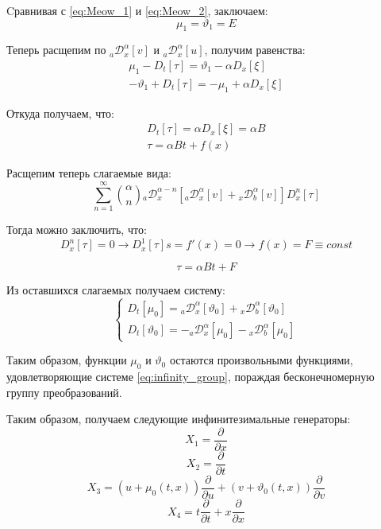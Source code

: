 \documentclass[a4paper, fontsize=14pt]{article}
\newcommand{\RLD}[3]{{}_{#1}\mathcal{D}_{#2}^{\alpha} \left[#3\right]} %
\newcommand{\D}[3]{D_{#1}^{#2} \left[ #3 \right]} %
\newcommand{\RLDa}[4]{{}_{#1}\mathcal{D}_{#2}^{#4} \left[#3\right]} %
\begin{document}
Cравнивая с \eqref{eq:Meow_1} и \eqref{eq:Meow_2}, заключаем:
\begin{equation*}
  \mu_1 = \vartheta _1 = E
\end{equation*}

Теперь расщепим по $\RLD{a}{x}{v}$ и $\RLD{a}{x}{u}$, получим равенства:
\begin{gather}
  \mu_1 - \D{t}{}{\tau} = \vartheta _1 - \alpha \D{x}{}{\xi} \\
  -\vartheta _1 + \D{t}{}{\tau} = - \mu_1 + \alpha \D{x}{}{\xi}
\end{gather}

Откуда получаем, что:
\begin{equation}
  \begin{aligned}
    \D{t}{}{\tau} = \alpha \D{x}{}{\xi} = \alpha B \\
    \tau = \alpha B t + f(x)
  \end{aligned}
\end{equation}

Расщепим теперь слагаемые вида:
\begin{equation*}
  \sum_{n=1}^{\infty} \binom{\alpha}{n} \RLDa{a}{x}{\RLD{a}{x}{v} + \RLD{x}{b}{v}}{\alpha-n} \D{x}{n}{\tau} 
\end{equation*}

Тогда можно заключить, что:
\begin{equation*}
  \D{x}{n}{\tau} = 0 \rightarrow \D{x}{1}{\tau}s = f'(x) = 0 \rightarrow f(x) = F \equiv const
\end{equation*}

\begin{equation}
  \tau = \alpha B t + F
\end{equation}

Из оставшихся слагаемых получаем систему:
\begin{equation}
  \label{eq:infinity_group}
  \begin{cases}
    \D{t}{}{\mu_0} = \RLD{a}{x}{\vartheta_0} + \RLD{x}{b}{\vartheta_0}\\
    \D{t}{}{\vartheta_0} = - \RLD{a}{x}{\mu_0} - \RLD{x}{b}{\mu_0}
  \end{cases}
\end{equation}

Таким образом, функции $\mu_0$ и $\vartheta_0$ остаются произвольными функциями, удовлетворяющие системе \eqref{eq:infinity_group},
пораждая бесконечномерную группу преобразований. %

Таким образом, получаем следующие инфинитезимальные генераторы:
\begin{equation}
  X_1 = \frac{\partial}{\partial x}
\end{equation}
\begin{equation}
  X_2 = \frac{\partial}{\partial t}
\end{equation}
\begin{equation}
  \label{eq:semi_rotation}
  X_3 = (u + \mu_0(t, x))\frac{\partial}{\partial u} + (v + \vartheta_0(t, x))\frac{\partial}{\partial v}
\end{equation}
\begin{equation}
  X_4 = t \frac{\partial}{\partial t} + x \frac{\partial}{\partial x}
\end{equation}
\end{document}
